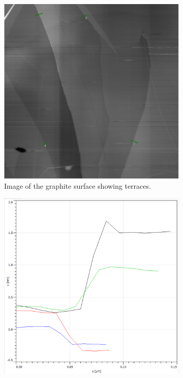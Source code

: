 \documentclass[12pt,a4paper]{article}
\begin{document}
\begin{figure}[H]
    \centering
    \begin{subfigure}[b]{0.48\linewidth}
        \centering
        \includegraphics[width=\linewidth]{../data/tasks/1/original.PNG}
        \caption{Image of the graphite surface showing terraces.}
        \label{fig:terraces}
    \end{subfigure}\hfill
    \begin{subfigure}[b]{0.48\linewidth}
        \centering
        \includegraphics[width=\linewidth]{../data/tasks/1/Capture.PNG}

\end{subfigure}
\end{figure}
\end{document}
